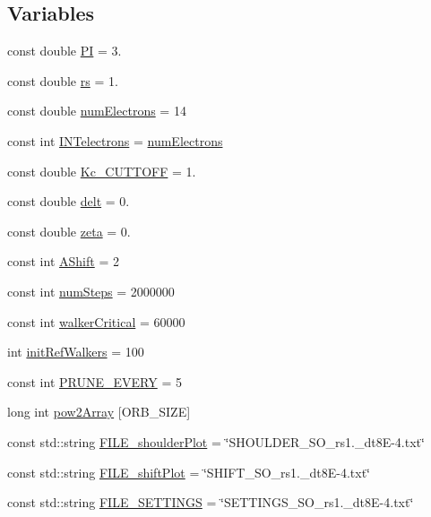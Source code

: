 \subsection*{Variables}
\begin{DoxyCompactItemize}
\item 
const double \hyperlink{UEG__MAIN__binarytest_8C_a952eac791b596a61bba0a133a3bb439f}{P\-I} = 3.
\item 
const double \hyperlink{UEG__MAIN__binarytest_8C_a363ad74e3d4570cd6bfaa4622e0af0bd}{rs} = 1.
\item 
const double \hyperlink{UEG__MAIN__binarytest_8C_a613e167ad809e33c73b70a24822cc6f9}{num\-Electrons} = 14
\item 
const int \hyperlink{UEG__MAIN__binarytest_8C_ace3e2699d268bc86fda1a7a41270c49e}{I\-N\-Telectrons} = \hyperlink{UEG__MAIN__binarytest_8C_a613e167ad809e33c73b70a24822cc6f9}{num\-Electrons}
\item 
const double \hyperlink{UEG__MAIN__binarytest_8C_aa8c8c523b8aaaef95263171d9b078d8d}{Kc\-\_\-\-C\-U\-T\-T\-O\-F\-F} = 1.
\item 
const double \hyperlink{UEG__MAIN__binarytest_8C_aa06f5594efa32a5569766c36690b4a22}{delt} = 0.
\item 
const double \hyperlink{UEG__MAIN__binarytest_8C_a50fb6782013c8c12243ca553cee0971a}{zeta} = 0.
\item 
const int \hyperlink{UEG__MAIN__binarytest_8C_a1b1b50ff28122bf25bbd141938893243}{A\-Shift} = 2
\item 
const int \hyperlink{UEG__MAIN__binarytest_8C_a957840dbdbfa8a29c76754be143dd02f}{num\-Steps} = 2000000
\item 
const int \hyperlink{UEG__MAIN__binarytest_8C_a6c7e0fd46bc659f43a5e2fe841b0aeeb}{walker\-Critical} = 60000
\item 
int \hyperlink{UEG__MAIN__binarytest_8C_a5481ef8ba617908ce12828cc4a8c45a3}{init\-Ref\-Walkers} = 100
\item 
const int \hyperlink{UEG__MAIN__binarytest_8C_aecb8ec6a7a5a3e737bef25336ec80927}{P\-R\-U\-N\-E\-\_\-\-E\-V\-E\-R\-Y} = 5
\item 
long int \hyperlink{UEG__MAIN__binarytest_8C_a5a4a522e121fab9651a940cabf5ac77d}{pow2\-Array} \mbox{[}O\-R\-B\-\_\-\-S\-I\-Z\-E\mbox{]}
\item 
const std\-::string \hyperlink{UEG__MAIN__binarytest_8C_a707c8ad6d9aee200d8624eae87e2299f}{F\-I\-L\-E\-\_\-shoulder\-Plot} = \char`\"{}S\-H\-O\-U\-L\-D\-E\-R\-\_\-S\-O\-\_\-rs1.\-\_\-dt8\-E-\/4.txt\char`\"{}
\item 
const std\-::string \hyperlink{UEG__MAIN__binarytest_8C_a8947574152f3a6b27e38b1f5ea8f61de}{F\-I\-L\-E\-\_\-shift\-Plot} = \char`\"{}S\-H\-I\-F\-T\-\_\-S\-O\-\_\-rs1.\-\_\-dt8\-E-\/4.txt\char`\"{}
\item 
const std\-::string \hyperlink{UEG__MAIN__binarytest_8C_aa87b0f6d11261495ace185e6d5fcdcb5}{F\-I\-L\-E\-\_\-\-S\-E\-T\-T\-I\-N\-G\-S} = \char`\"{}S\-E\-T\-T\-I\-N\-G\-S\-\_\-S\-O\-\_\-rs1.\-\_\-dt8\-E-\/4.txt\char`\"{}
\end{DoxyCompactItemize}


